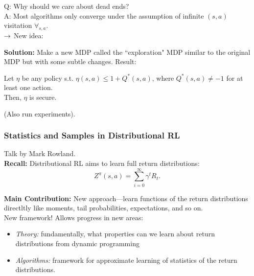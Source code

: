 
Q: Why should we care about dead ends? \\

A: Most algorithms only converge under the assumption of infinite $(s,a)$ visitation $\forall_{s,a}$. \\

$\rightarrow$ New idea:

{\bf Solution:} Make a new MDP called the ``exploration" MDP similar to the original MDP but with some subtle changes. Result:
\begin{theorem}
Let $\eta$ be any policy s.t. $\eta(s,a) \leq 1+ Q^*(s,a)$, where $Q^*(s,a) \neq -1$ for at least one action. \\

Then, $\eta$ is secure.
\end{theorem}

(Also run experiments). \\


\spacerule
\subsubsection{Statistics and Samples in Distributional RL~\cite{rowland2019statistics}}

Talk by Mark Rowland. \\

{\bf Recall:} Distributional RL aims to learn full return distributions:
\[
Z^{\pi}(s,a) = \sum_{i=0}^\infty \gamma^t R_t.
\]

{\bf Main Contribution:} New approach---learn functions of the return distributions directltly like moments, tail probabilities, expectations, and so on. \\

New framework! Allows progress in new areas:
\begin{itemize}
    \item {\it Theory:} fundamentally, what properties can we learn about return distributions from dynamic programming
    \item {\it Algorithms:} framework for approximate learning of statistics of the return distributions.
\end{itemize}

